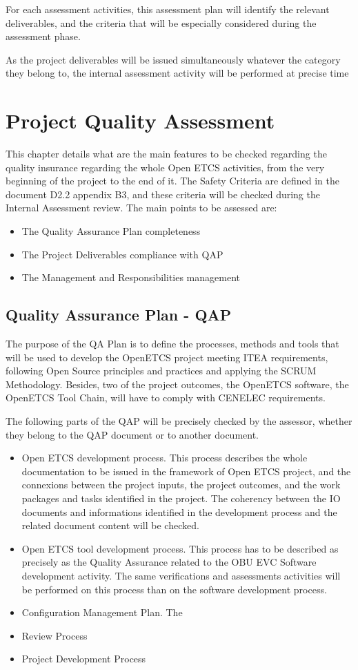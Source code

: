 \documentclass{template/openetcs_report}
\begin{document}
For each assessment activities, this assessment plan will identify the relevant deliverables, and the criteria that will be especially considered during the assessment phase.

As the project deliverables will be issued simultaneously whatever the category they belong to, the internal assessment activity will be performed at precise time

\chapter{Project Quality Assessment}
This chapter details what are the main features to be checked regarding the quality insurance regarding the whole Open ETCS activities, from the very beginning of the project to the end of it.
The Safety Criteria are defined in the document D2.2 appendix B3, and these criteria will be checked during the Internal Assessment review. The main points to be assessed are:
\begin{itemize}
\item The Quality Assurance Plan completeness
\item The Project Deliverables compliance with QAP
\item The Management and Responsibilities management 
\end{itemize}

\section{Quality Assurance Plan - QAP}
The purpose of the QA Plan is to define the processes, methods and tools that will be used to develop the OpenETCS project meeting ITEA requirements, following Open Source principles and practices and applying the SCRUM Methodology. Besides, two of the project outcomes, the OpenETCS software, the OpenETCS Tool Chain, will have to comply with CENELEC requirements.

The following parts of the QAP will be precisely checked by the assessor, whether they belong to the QAP document or to another document.
\begin{itemize}
\item  Open ETCS development process. This process describes the whole documentation to be issued in the framework of Open ETCS project, and the connexions between the project inputs, the project outcomes, and the work packages and tasks identified in the project. The coherency between the IO documents and informations identified in the development process and the related document content will be checked.
\item  Open ETCS tool development process. This process has to be described as precisely as the Quality Assurance related to the OBU EVC Software development activity. The same verifications and assessments activities will be performed on this process than on the software development process.
\item Configuration Management Plan. The
\item Review Process
\item Project Development Process
\end{itemize}
\end{document}
